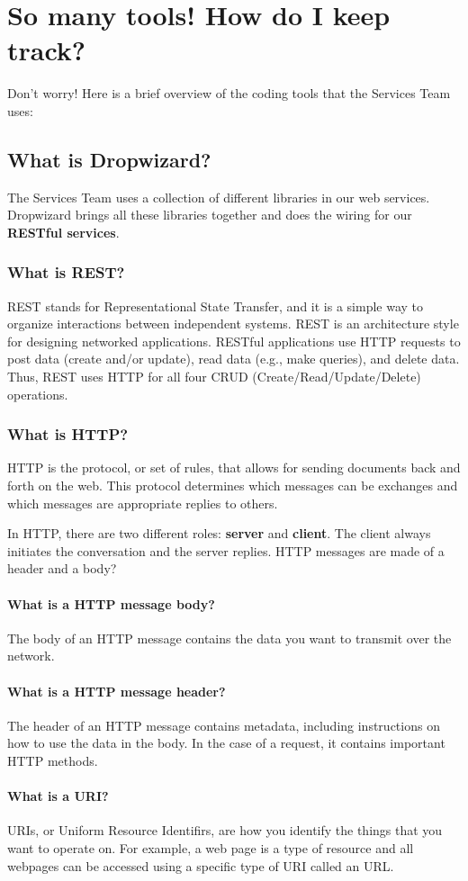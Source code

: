 \documentclass[oneside]{book}
\begin{document}
\chapter{So many tools! How do I keep track?}
Don't worry! Here is a brief overview of the coding tools that the Services Team uses:
\section{What is Dropwizard?}
The Services Team uses a collection of different libraries in our web services. Dropwizard brings all these libraries together and does the wiring for our \textbf{RESTful services}.
\subsection{What is REST?}
REST stands for Representational State Transfer, and it is a simple way to organize interactions between independent systems. REST is an architecture style for designing networked applications. RESTful applications use HTTP requests to post data (create and/or update), read data (e.g., make queries), and delete data. Thus, REST uses HTTP for all four CRUD (Create/Read/Update/Delete) operations.
\subsection{What is HTTP?}
HTTP is the protocol, or set of rules, that allows for sending documents back and forth on the web. This protocol determines which messages can be exchanges and which messages are appropriate replies to others. \par
In HTTP, there are two different roles: \textbf{server} and \textbf{client}. The client always initiates the conversation and the server replies. HTTP messages are made of a header and a body?
\subsubsection{What is a HTTP message body?}
The body of an HTTP message contains the data you want to transmit over the network. 
\subsubsection{What is a HTTP message header?}
The header of an HTTP message contains metadata, including instructions on how to use the data in the body. In the case of a request, it contains important HTTP methods.
\subsubsection{What is a URI?}
URIs, or Uniform Resource Identifirs, are how you identify the things that you want to operate on. For example, a web page is a type of resource and all webpages can be accessed using a specific type of URI called an URL.
\end{document}
